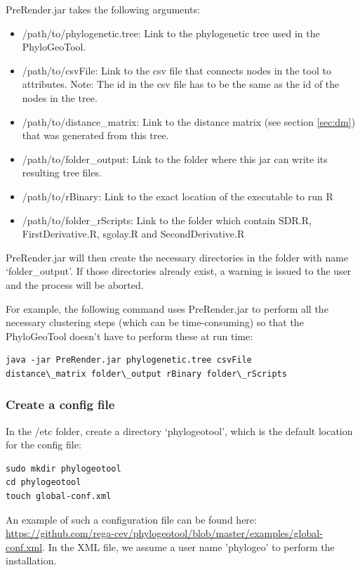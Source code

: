 \documentclass[a4paper, 11pt]{article} %
\begin{document}
PreRender.jar takes the following arguments: 
\begin{itemize}
\item /path/to/phylogenetic.tree: Link to the phylogenetic tree used in the PhyloGeoTool.
\item /path/to/csvFile: Link to the csv file that connects nodes in the tool to attributes. Note: The id in the csv file has to be the same as the id of the nodes in the tree.
\item /path/to/distance\_matrix: Link to the distance matrix (see section \ref{sec:dm}) that was generated from this tree.
\item /path/to/folder\_output: Link to the folder where this jar can write its resulting tree files.
\item /path/to/rBinary: Link to the exact location of the executable to run R 
\item /path/to/folder\_rScripts: Link to the folder which contain SDR.R, FirstDerivative.R, sgolay.R and SecondDerivative.R
\end{itemize}
PreRender.jar will then create the necessary directories in the folder with name `folder\_output'.
If those directories already exist, a warning is issued to the user and the process will be aborted.

For example, the following command uses PreRender.jar to perform all the necessary clustering steps (which can be time-consuming) so that the PhyloGeoTool doesn't have to perform these at run time: 
\begin{verbatim}
java -jar PreRender.jar phylogenetic.tree csvFile
distance\_matrix folder\_output rBinary folder\_rScripts
\end{verbatim}


\subsubsection{Create a config file} \label{sssec:config_file}

In the /etc folder, create a directory `phylogeotool', which is the default location for the config file:
\begin{verbatim}
sudo mkdir phylogeotool
cd phylogeotool
touch global-conf.xml
\end{verbatim}

An example of such a configuration file can be found here: \url{https://github.com/rega-cev/phylogeotool/blob/master/examples/global-conf.xml}.
In the XML file, we assume a user name 'phylogeo' to perform the installation.
\end{document}
